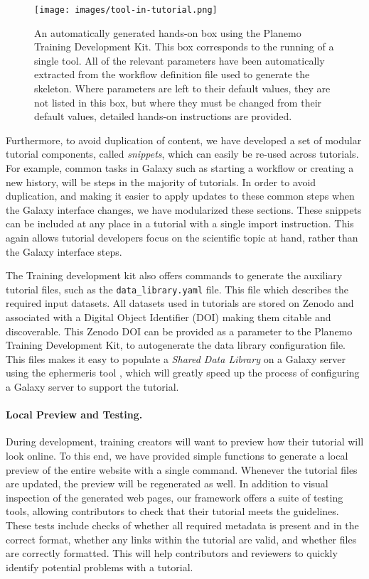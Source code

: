 \documentclass[10pt,letterpaper]{article}
\begin{document}
\begin{figure}[!ht]
	\centering
	\texttt{[image: images/tool-in-tutorial.png]}
	\caption{An automatically generated hands-on box using the Planemo Training Development Kit. This box corresponds to the running of a single tool. All of the relevant parameters have been automatically extracted from the workflow definition file used to generate the skeleton. Where parameters are left to their default values, they are not listed in this box, but where they must be changed from their default values, detailed hands-on instructions are provided.\label{fig:planemo}}
\end{figure}


Furthermore, to avoid duplication of content, we have developed a set of modular tutorial components, called \emph{snippets}, which can easily be re-used across tutorials.
For example, common tasks in Galaxy such as starting a workflow or creating a new history, will be steps in the majority of tutorials. In order to avoid duplication, and making it easier to apply updates to these common steps when the Galaxy interface changes, we have modularized these sections.
These snippets can be included at any place in a tutorial with a single import instruction.
This again allows tutorial developers focus on the scientific topic at hand, rather than the Galaxy interface steps.


The Training development kit also offers commands to generate the auxiliary tutorial files, such as the \verb+data_library.yaml+ file.
This file which describes the required input datasets. All datasets used in tutorials are stored on Zenodo and associated with a Digital Object Identifier (DOI) making them citable and discoverable.
This Zenodo DOI can be provided as a parameter to the Planemo Training Development Kit, to autogenerate the data library configuration file.
This files makes it easy to populate a \emph{Shared Data Library} on a Galaxy server using the ephermeris tool \cite{TODO}, which will greatly speed up the process of configuring a Galaxy server to support the tutorial.



\paragraph*{Local Preview and Testing.} During development, training creators will want to preview how their tutorial will look online.
To this end, we have provided simple functions to generate a local preview of the entire website with a single command. Whenever the tutorial files are updated, the preview will be regenerated as well.
In addition to visual inspection of the generated web pages, our framework offers a suite of testing tools, allowing contributors to check that their tutorial meets the guidelines.
These tests include checks of whether all required metadata is present and in the correct format, whether any links within the tutorial are valid, and whether files are correctly formatted.
This will help contributors and reviewers to quickly identify potential problems with a tutorial.
\end{document}
